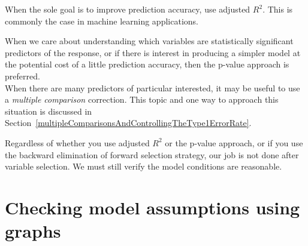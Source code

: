 \begin{tipBox}{
When the sole goal is to improve prediction accuracy, use adjusted $R^2$. This is commonly the case in machine learning applications.}
\end{tipBox}

\begin{tipBox}{
When we care about understanding which variables are statistically significant predictors of the response, or if there is interest in producing a simpler model at the potential cost of a little prediction accuracy, then the p-value approach is preferred.\\[-2mm]

When there are many predictors of particular interested,
it may be useful to use a
\emph{multiple comparison}
correction.
This topic and one way to approach this situation
is discussed in
Section~\ref{multipleComparisonsAndControllingTheType1ErrorRate}.}
\end{tipBox}


Regardless of whether you use adjusted $R^2$ or the p-value approach, or if you use the backward elimination of forward selection strategy, our job is not done after variable selection. We must still verify the model conditions are reasonable.




\section[Checking model assumptions using graphs]{Checking model assumptions using graphs ~}
\label{multipleRegressionModelAssumptions}


